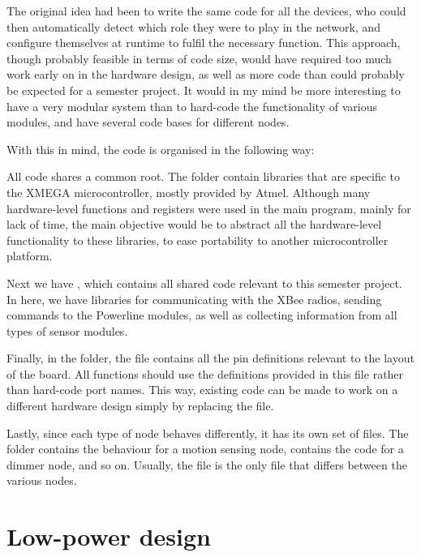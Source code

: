 The original idea had been to write the same code for all the devices, who could
then automatically detect which role they were to play in the network, and
configure themselves at runtime to fulfil the necessary function. This approach,
though probably feasible in terms of code size, would have required too much
work early on in the hardware design, as well as more code than could probably
be expected for a semester project. It would in my mind be more interesting to
have a very modular system than to hard-code the functionality of various
modules, and have several code bases for different nodes.

With this in mind, the code is organised in the following way:


All code shares a common root. The folder  contain libraries
that are specific to the XMEGA microcontroller, mostly provided by Atmel.
Although many hardware-level functions and registers were used in the main
program, mainly for lack of time, the main objective would be to abstract all
the hardware-level functionality to these libraries, to ease portability to
another microcontroller platform.

Next we have , which contains all shared code relevant to
this semester project. In here, we have libraries for communicating with the
XBee radios, sending commands to the Powerline modules, as well as collecting
information from all types of sensor modules.

Finally, in the  folder, the  file contains
all the pin definitions relevant to the layout of the board. All functions
should use the definitions provided in this file rather than hard-code port
names. This way, existing code can be made to work on a different hardware
design simply by replacing the  file.

Lastly, since each type of node behaves differently, it has its own set of
files. The  folder contains the behaviour for a motion
sensing node,  contains the code for a dimmer node, and so
on. Usually, the  file is the only file that differs between the
various nodes.

\section{Low-power design}

